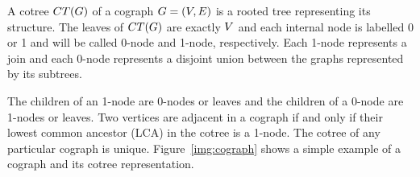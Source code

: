 \documentclass[msc,english,table,xcdraw]{ppgccufmg}
\begin{document}
A cotree $CT(G)$ of a cograph $G = (V,E)$ is a rooted 
tree representing its structure. 
The leaves of $CT(G)$ are exactly $V$ and each internal 
node is labelled 0 or 1 and will be called 0-node and 1-node, respectively. 
Each 1-node represents a join and each 0-node represents a disjoint union 
between the graphs represented by its subtrees.

The children of an 1-node are 0-nodes or leaves and the children of a 0-node 
are 1-nodes or leaves. 
Two vertices are adjacent in a cograph if and only if their lowest common 
ancestor (LCA) in the cotree is a 1-node.
The cotree of any particular cograph is unique.
Figure~\ref{img:cograph} shows a simple example of a cograph and its cotree representation.



\end{document}
